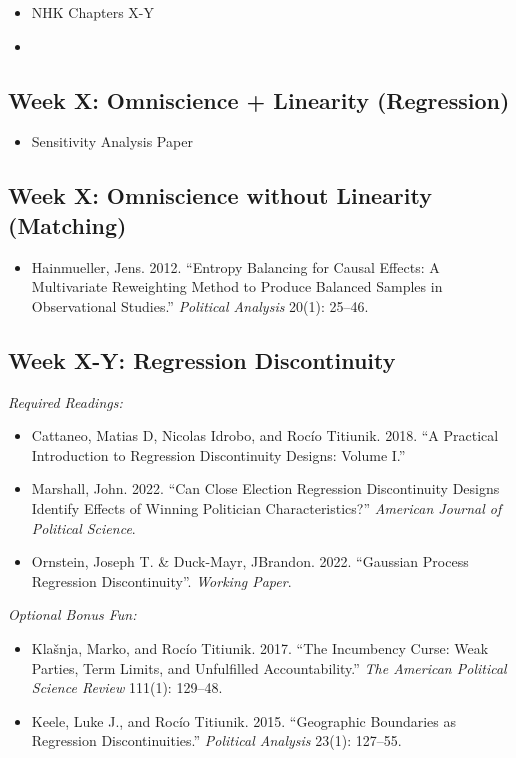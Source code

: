 \documentclass[11pt, letterpaper]{article}
\begin{document}
\begin{itemize}
	\item NHK Chapters X-Y
	\item 
\end{itemize}


\subsection*{Week X: Omniscience + Linearity (Regression)}

\begin{itemize}
	\item Sensitivity Analysis Paper
\end{itemize}

\subsection*{Week X: Omniscience without Linearity (Matching)}

\begin{itemize}
	\item Hainmueller, Jens. 2012. ``Entropy Balancing for Causal Effects: A Multivariate Reweighting Method to Produce Balanced Samples in Observational Studies.'' \textit{Political Analysis} 20(1): 25–46.
\end{itemize}


\subsection*{Week X-Y: Regression Discontinuity}

\textit{Required Readings:}

\begin{itemize}
	
	\item Cattaneo, Matias D, Nicolas Idrobo, and Rocío Titiunik. 2018. ``A Practical Introduction to Regression Discontinuity Designs: Volume I.''
	\item Marshall, John. 2022. ``Can Close Election Regression Discontinuity Designs Identify Effects of Winning Politician Characteristics?'' \textit{American Journal of Political Science}.
	\item Ornstein, Joseph T. \& Duck-Mayr, JBrandon. 2022. ``Gaussian Process Regression Discontinuity''. \textit{Working Paper}.
\end{itemize}

\noindent \textit{Optional Bonus Fun:}

\begin{itemize}
	\item Klašnja, Marko, and Rocío Titiunik. 2017. ``The Incumbency Curse: Weak Parties, Term Limits, and Unfulfilled Accountability.'' \textit{The American Political Science Review} 111(1): 129–48.
	\item Keele, Luke J., and Rocío Titiunik. 2015. ``Geographic Boundaries as Regression Discontinuities.'' \textit{Political Analysis} 23(1): 127–55.
	
\end{itemize}



\end{document}

